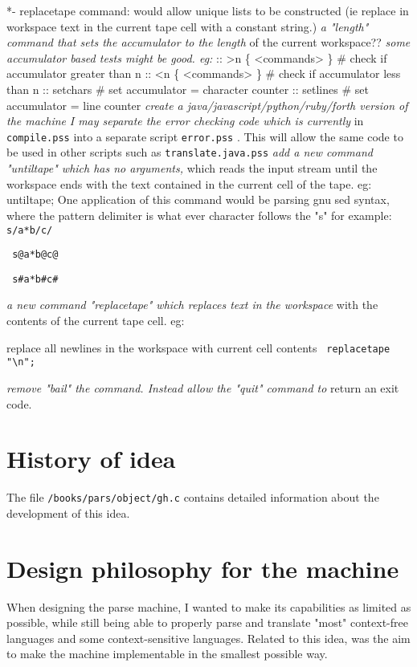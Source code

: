 \documentclass[a4paper,12pt]{article}
\begin{document}
  *- replacetape command: would allow unique lists to be
     constructed (ie replace in workspace text in the current tape cell
     with a constant string.)
 \emph{ a "length" command that sets the accumulator to the length }
    of the current workspace??
 \emph{ some accumulator based tests might be good. eg: }
    :: >n \{ <commands> \} \# check if accumulator greater than n
    :: <n \{ <commands> \} \# check if accumulator less than n
    :: setchars \# set accumulator = character counter
    :: setlines \# set accumulator = line counter
 \emph{ create a java/javascript/python/ruby/forth version of the machine }
 \emph{ I may separate the error checking code which is currently }
    in \texttt{compile.pss} into a separate script \texttt{error.pss} . This will
    allow the same code to be used in other scripts such as
    \texttt{translate.java.pss}
 \emph{ add a new command "untiltape" which has no arguments, }
    which reads the input stream until the workspace ends with
    the text contained in the current cell of the tape.
       eg: untiltape;
    One application of this command would be parsing gnu sed
    syntax, where the pattern delimiter is what ever character
    follows the "s" for example: 
 \verb| s/a*b/c/ |
 
 \verb| s@a*b@c@ |
 
 \verb| s#a*b#c# |

 \emph{ a new command "replacetape" which replaces text in the workspace }
    with the contents of the current tape cell. eg:

      replace all newlines in the workspace with current cell contents 
 \verb| replacetape "\n";  |

 \emph{ remove "bail" the command. Instead allow the "quit" command to  }
    return an exit code.

\section{History of idea}

  The file \texttt{/books/pars/object/gh.c} contains detailed information about the
  development of this idea.

\section{Design philosophy for the machine}

  When designing the parse machine, I wanted to make its capabilities as
  limited as possible, while still being able to properly parse and translate
  "most" context-free languages and some context-sensitive languages. Related
  to this idea, was the aim to make the machine implementable in the smallest
  possible way.
\end{document}
